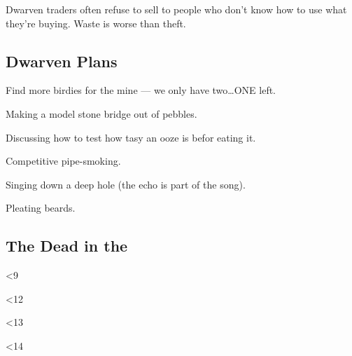 \documentclass[10pt,twoside]{book}
\begin{document}
Dwarven traders often refuse to sell to people who don't know how to use what they're buying.
Waste is worse than theft.

\dwarventrader

\subsection{Dwarven Plans}

\begin{dlist}
  \item Find more birdies for the mine --- we only have two\ldots ONE left.
  \item Making a model stone bridge out of pebbles.
  \item Discussing how to test how tasy an ooze is befor eating it.
  \item Competitive pipe-smoking.
  \item Singing down a deep hole (the echo is part of the song).
  \item Pleating beards.
\end{dlist}

\dwarvensoldier

\dwarvensoldier

\dwarvensoldier

\dwarvenrunemaster

\showStdSpells

\clearpage

\subsection{The Dead in the }

 

\ifnum\thepage<9
  \ghoul
\fi

\ghoul

\ghast

\ghast

\clearpage

\demilich

\showStdSpells

\ifnum\thepage<12
  \ghast

  \ghast
\fi

\clearpage

\demilich

\showStdSpells

\clearpage

\ifnum\thepage<13
  \undeadgoblin

  \undeadhobgoblin
\fi


\ifnum\thepage<14
  \clearpage
  \undeadogre
\fi
\end{document}
